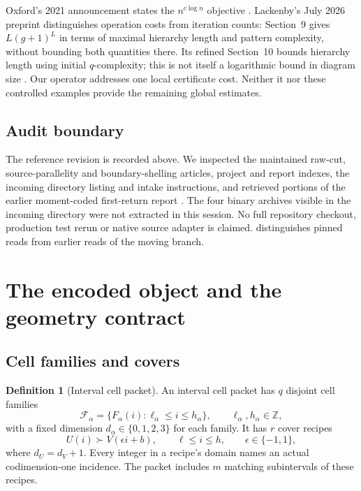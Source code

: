 \documentclass[11pt,letterpaper]{article}
\theoremstyle{definition}
\newtheorem{definition}[theorem]{Definition}
\theoremstyle{remark}\newtheorem{remark}[theorem]{Remark}
\newcommand{\Z}{\mathbb Z}
\newcommand{\code}[1]{\texttt{\detokenize{#1}}}
\begin{document}
Oxford's 2021 announcement states the $n^{c\log n}$ objective \cite{announcement}. Lackenby's July 2026 preprint distinguishes operation costs from iteration counts: Section~9 gives $L(g+1)^L$ in terms of maximal hierarchy length and pattern complexity, without bounding both quantities there. Its refined Section~10 bounds hierarchy length using initial $q$-complexity; this is not itself a logarithmic bound in diagram size \cite{lackenby2026}. Our operator addresses one local certificate cost. Neither it nor these controlled examples provide the remaining global estimates.

\subsection{Audit boundary}

The reference revision is recorded above. We inspected the maintained raw-cut, source-parallelity and boundary-shelling articles, project and report indexes, the incoming directory listing and intake instructions, and retrieved portions of the earlier moment-coded first-return report \cite{repo-cut,repo-parallelity,repo-shellings,repo-index,predecessor}. The four binary archives visible in the incoming directory were not extracted in this session. No full repository checkout, production test rerun or native source adapter is claimed. \code{SOURCE_AUDIT.md} distinguishes pinned reads from earlier reads of the moving branch.

\section{The encoded object and the geometry contract}
\label{sec:contract}

\subsection{Cell families and covers}

\begin{definition}[Interval cell packet]
An interval cell packet has $q$ disjoint cell families
\[
 \mathcal F_\alpha=\{F_\alpha(i):\ell_\alpha\leq i\leq h_\alpha\},
 \qquad \ell_\alpha,h_\alpha\in\Z,
\]
with a fixed dimension $d_\alpha\in\{0,1,2,3\}$ for each family. It has $r$ cover recipes
\begin{equation}
 U(i)\succ V(\epsilon i+b),\qquad \ell\leq i\leq h,
 \qquad \epsilon\in\{-1,1\},
 \label{eq:cover}
\end{equation}
where $d_U=d_V+1$. Every integer in a recipe's domain names an actual codimension-one incidence. The packet includes $m$ matching subintervals of these recipes.
\end{definition}
\end{document}

